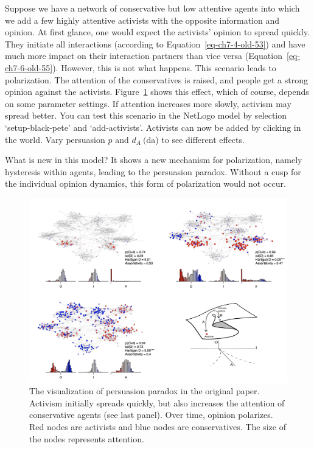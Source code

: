\documentclass[
  letterpaper,
]{scrbook}
\begin{document}
Suppose we have a network of conservative but low attentive agents into
which we add a few highly attentive activists with the opposite
information and opinion. At first glance, one would expect the
activists' opinion to spread quickly. They initiate all interactions
(according to Equation~\ref{eq-ch7-4-old-53}) and have much more impact
on their interaction partners than vice versa
(Equation~\ref{eq-ch7-6-old-55}). However, this is not what happens.
This scenario leads to polarization. The attention of the conservatives
is raised, and people get a strong opinion against the activists.
Figure~\ref{fig-ch7-img11-old-99} shows this effect, which of course,
depends on some parameter settings. If attention increases more slowly,
activism may spread better. You can test this scenario in the NetLogo
model by selection `setup-black-pete' and `add-activists'. Activists can
now be added by clicking in the world. Vary persuasion \(p\) and
\(d_{A}\ (\)da) to see different effects.

What is new in this model? It shows a new mechanism for polarization,
namely hysteresis within agents, leading to the persuasion paradox.
Without a cusp for the individual opinion dynamics, this form of
polarization would not occur.

\begin{figure}

{\centering \includegraphics[width=6.26389in,height=\textheight]{media/ch7/image11.jpg}

}

\caption{\label{fig-ch7-img11-old-99}The visualization of persuasion
paradox in the original paper. Activism initially spreads quickly, but
also increases the attention of conservative agents (see last panel).
Over time, opinion polarizes. Red nodes are activists and blue nodes are
conservatives. The size of the nodes represents attention.}

\end{figure}
\end{document}
